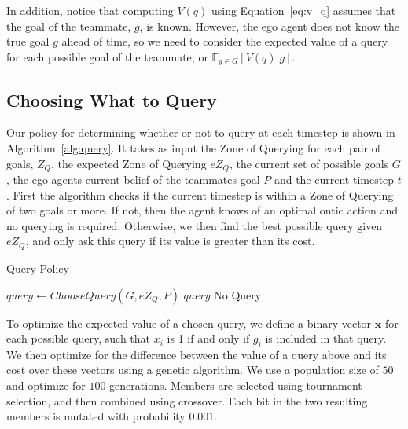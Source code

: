 \documentclass[letterpaper]{article}
\begin{document}
In addition, notice that computing $V(q)$ using Equation~\ref{eq:v_q} assumes that the goal of the teammate, $g$, is known. However, the ego agent does not know the true goal $g$ ahead of time, so we need to consider the expected value of a query for each possible goal of the teammate, or $\mathbb{E}_{g\in G}[V(q) | g]$.













\subsection{Choosing What to Query}


Our policy for determining whether or not to query at each timestep is shown in Algorithm~\ref{alg:query}. It takes as input the Zone of Querying for each pair of goals, $Z_Q$, the expected Zone of Querying $eZ_Q$, the current set of possible goals $G$, the ego agents current belief of the teammates goal $P$ and the current timestep $t$. First the algorithm checks if the current timestep is within a Zone of Querying of two goals or more. If not, then the agent knows of an optimal ontic action and no querying is required. Otherwise, we then find the best possible query given $eZ_Q$, and only ask this query if its value is greater than its cost.
\begin{algorithm}[t]
\caption{Query Policy}
\begin{algorithmic}
\State $query \gets ChooseQuery(G, eZ_Q, P)$
\State \Return $query$
\EndIf
\EndIf
\State \Return No Query
\EndProcedure
\end{algorithmic}
\label{alg:query}
\end{algorithm}

To optimize the expected value of a chosen query, we define a binary vector $\textbf{x}$ for each possible query, such that $x_i$ is 1 if and only if $g_i$ is included in that query. We then optimize for the difference between the value of a query above and its cost over these vectors using a genetic algorithm. We use a population size of $50$ and optimize for $100$ generations. Members are selected using tournament selection, and then combined using crossover. Each bit in the two resulting members is mutated with probability $0.001$.
\end{document}
